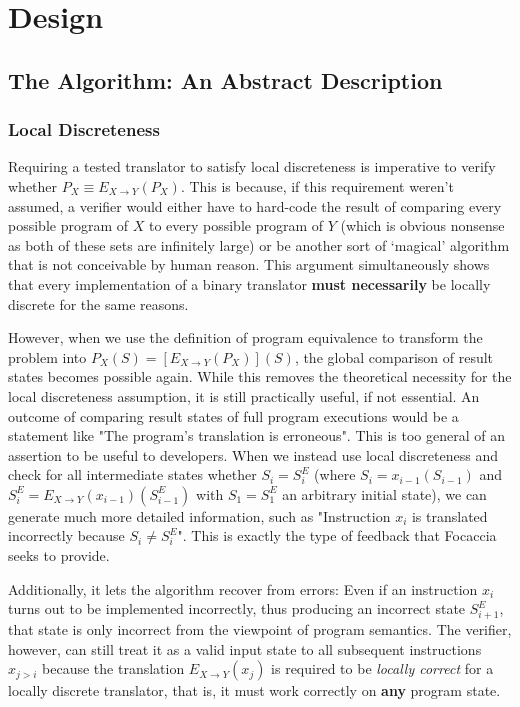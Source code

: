 \chapter{Design}\label{chapter:design}

\section{The Algorithm: An Abstract Description}

\subsection{Local Discreteness}\label{sec:local_discreteness}

Requiring a tested translator to satisfy local discreteness is imperative to verify whether $P_X \equiv E_{X \rightarrow
Y}(P_X)$. This is because, if this requirement weren't assumed, a verifier would either have to hard-code the result of
comparing every possible program of $X$ to every possible program of $Y$ (which is obvious nonsense as both of these
sets are infinitely large) or be another sort of `magical' algorithm that is not conceivable by human reason. This
argument simultaneously shows that every implementation of a binary translator \textbf{must necessarily} be locally
discrete for the same reasons.

However, when we use the definition of program equivalence to transform the problem into $P_X(S) = [E_{X \rightarrow
Y}(P_X)](S)$, the global comparison of result states becomes possible again. While this removes the theoretical
necessity for the local discreteness assumption, it is still practically useful, if not essential. An outcome of
comparing result states of full program executions would be a statement like "The program's translation is erroneous".
This is too general of an assertion to be useful to developers. When we instead use local discreteness and check for all
intermediate states whether $S_i = S^E_i$ (where $S_i = x_{i-1}(S_{i-1})$ and $S^E_i = E_{X \rightarrow
Y}(x_{i-1})(S^E_{i-1})$ with $S_1 = S^E_1$ an arbitrary initial state), we can generate much more detailed information,
such as "Instruction $x_i$ is translated incorrectly because $S_i \neq S^E_i$". This is exactly the type of feedback
that Focaccia seeks to provide.

Additionally, it lets the algorithm recover from errors: Even if an instruction $x_i$ turns out to be implemented
incorrectly, thus producing an incorrect state $S^E_{i+1}$, that state is only incorrect from the viewpoint of program
semantics. The verifier, however, can still treat it as a valid input state to all subsequent instructions $x_{j > i}$
because the translation $E_{X \rightarrow Y}(x_j)$ is required to be \textit{locally correct} for a locally discrete
translator, that is, it must work correctly on \textbf{any} program state.

